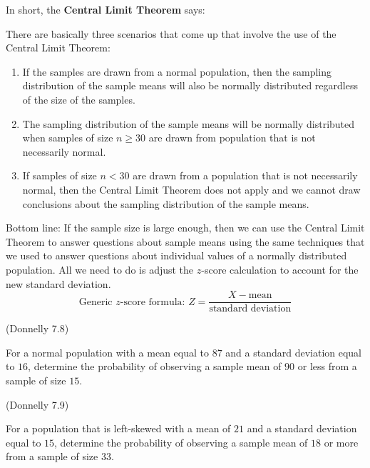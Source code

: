 \documentclass[12pt, letterpaper]{article}
\newcounter{exercise}
\theoremstyle{definition}
\begin{document}
\begin{theorem}
In short, the \textbf{Central Limit Theorem} says:
\vspace*{1in}
\end{theorem}

\noindent There are basically three scenarios that come up that involve the use of the Central Limit Theorem:

\begin{enumerate}

\item If the samples are drawn from a normal population, then the sampling distribution of the sample means will also be normally distributed regardless of the size of the samples.

\item The sampling distribution of the sample means will be normally distributed when samples of size $n\geq 30$ are drawn from population that is not necessarily normal.

\item If samples of size $n<30$ are drawn from a population that is not necessarily normal, then the Central Limit Theorem does not apply and we cannot draw conclusions about the sampling distribution of the sample means.

\end{enumerate}


\begin{statement}
Bottom line:  If the sample size is large enough, then we can use the Central Limit Theorem to answer questions about sample means using the same techniques that we used to answer questions about individual values of a normally distributed population.  All we need to do is adjust the $z$-score calculation to account for the new standard deviation.
$$ \text{Generic $z$-score formula:  }  Z=\frac{X-\text{mean}}{\text{standard deviation}}   $$
\end{statement}


\begin{exercise}  (Donnelly 7.8)

For a normal population with a mean equal to $87$ and a standard deviation equal to $16$, determine the probability of observing a sample mean of $90$ or less from a sample of size $15$.

\end{exercise}

\vfill

\newpage

\begin{exercise}  (Donnelly 7.9)

For a population that is left-skewed with a mean of $21$ and a standard deviation equal to $15$, determine the probability of observing a sample mean of $18$ or more from a sample of size $33$.

\end{exercise}
\end{document}
